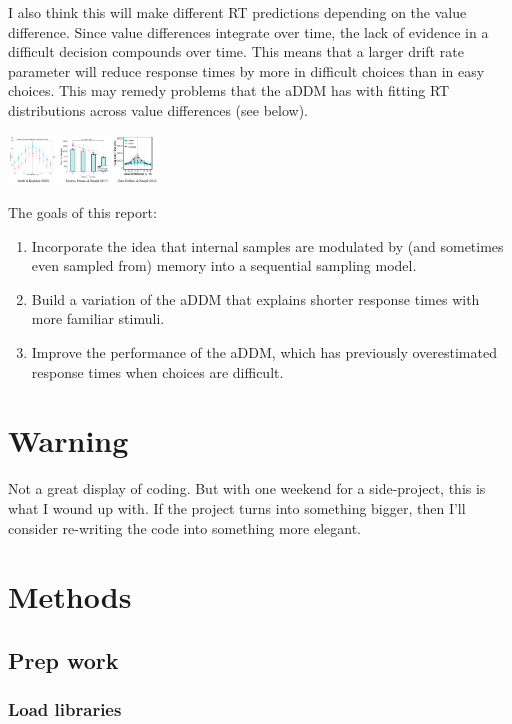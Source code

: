 \documentclass[
]{book}
\providecommand{\tightlist}{%
  \setlength{\itemsep}{0pt}\setlength{\parskip}{0pt}}
\begin{document}
I also think this will make different RT predictions depending on the value difference. Since value differences integrate over time, the lack of evidence in a difficult decision compounds over time. This means that a larger drift rate parameter will reduce response times by more in difficult choices than in easy choices. This may remedy problems that the aDDM has with fitting RT distributions across value differences (see below).

\includegraphics[width=0.3\textwidth,height=\textheight]{images/mem-aDDM-aDDM_rt_pred.PNG}

The goals of this report:

\begin{enumerate}
\def\labelenumi{\arabic{enumi}.}
\tightlist
\item
  Incorporate the idea that internal samples are modulated by (and sometimes even sampled from) memory into a sequential sampling model.
\item
  Build a variation of the aDDM that explains shorter response times with more familiar stimuli.
\item
  Improve the performance of the aDDM, which has previously overestimated response times when choices are difficult.
\end{enumerate}

\hypertarget{warning}{%
\section{Warning}\label{warning}}

Not a great display of coding. But with one weekend for a side-project, this is what I wound up with. If the project turns into something bigger, then I'll consider re-writing the code into something more elegant.

\hypertarget{methods}{%
\section{Methods}\label{methods}}

\hypertarget{prep-work-4}{%
\subsection{Prep work}\label{prep-work-4}}

\hypertarget{load-libraries}{%
\subsubsection{Load libraries}\label{load-libraries}}
\end{document}

